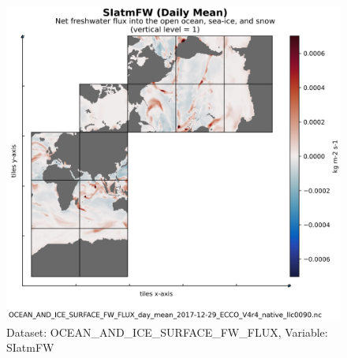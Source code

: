 \begin{figure}[H]
\centering
\includegraphics[scale=0.55]{../images/plots/native_plots/Ocean_and_Sea-Ice_Surface_Freshwater_Fluxes/SIatmFW.png}
\caption{Dataset: OCEAN\_AND\_ICE\_SURFACE\_FW\_FLUX, Variable: SIatmFW}
\label{tab:table-OCEAN_AND_ICE_SURFACE_FW_FLUX_SIatmFW-Plot}
\end{figure}
\newpage
\pagebreak

